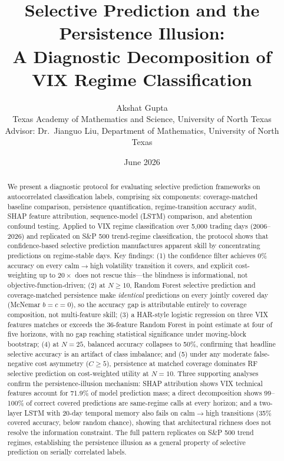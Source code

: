 \documentclass[12pt]{article}
\title{\textbf{Selective Prediction and the Persistence Illusion:\\
A Diagnostic Decomposition of VIX Regime Classification}}
\author{
    Akshat Gupta \\
    \small Texas Academy of Mathematics and Science, University of North Texas \\
    \small Advisor: Dr.\ Jianguo Liu, Department of Mathematics, University of North Texas
}
\date{June 2026}
\begin{document}
\maketitle

\begin{abstract}
We present a diagnostic protocol for evaluating selective prediction frameworks on autocorrelated classification labels, comprising six components: coverage-matched baseline comparison, persistence quantification, regime-transition accuracy audit, SHAP feature attribution, sequence-model (LSTM) comparison, and abstention confound testing. Applied to VIX regime classification over 5,000 trading days (2006--2026) and replicated on S\&P 500 trend-regime classification, the protocol shows that confidence-based selective prediction manufactures apparent skill by concentrating predictions on regime-stable days. Key findings: (1) the confidence filter achieves 0\% accuracy on every calm$\to$high volatility transition it covers, and explicit cost-weighting up to $20{\times}$ does not rescue this---the blindness is informational, not objective-function-driven; (2) at $N \geq 10$, Random Forest selective prediction and coverage-matched persistence make \emph{identical} predictions on every jointly covered day (McNemar $b = c = 0$), so the accuracy gap is attributable entirely to coverage composition, not multi-feature skill; (3) a HAR-style logistic regression on three VIX features matches or exceeds the 36-feature Random Forest in point estimate at four of five horizons, with no gap reaching statistical significance under moving-block bootstrap; (4) at $N = 25$, balanced accuracy collapses to 50\%, confirming that headline selective accuracy is an artifact of class imbalance; and (5) under any moderate false-negative cost asymmetry ($C \geq 5$), persistence at matched coverage dominates RF selective prediction on cost-weighted utility at $N = 10$. Three supporting analyses confirm the persistence-illusion mechanism: SHAP attribution shows VIX technical features account for 71.9\% of model prediction mass; a direct decomposition shows 99--100\% of correct covered predictions are same-regime calls at every horizon; and a two-layer LSTM with 20-day temporal memory also fails on calm$\to$high transitions (35\% covered accuracy, below random chance), showing that architectural richness does not resolve the information constraint. The full pattern replicates on S\&P 500 trend regimes, establishing the persistence illusion as a general property of selective prediction on serially correlated labels.
\end{abstract}
\end{document}

